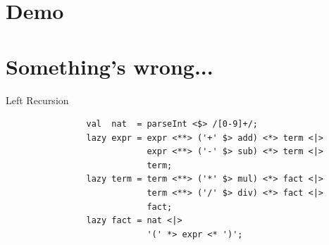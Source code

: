 \documentclass[aspectratio=169]{beamer}
\begin{document}
    \section{Demo}
    \section{Something's wrong...}
    \begin{frame}[fragile]{Left Recursion}
        \begin{overprint}
            \begin{verbatim}
                val  nat  = parseInt <$> /[0-9]+/;
                lazy expr = expr <**> ('+' $> add) <*> term <|>
                            expr <**> ('-' $> sub) <*> term <|>
                            term;
                lazy term = term <**> ('*' $> mul) <*> fact <|>
                            term <**> ('/' $> div) <*> fact <|>
                            fact;
                lazy fact = nat <|>
                            '(' *> expr <* ')';
            \end{verbatim}
        \end{overprint}
    \end{frame}
\end{document}
